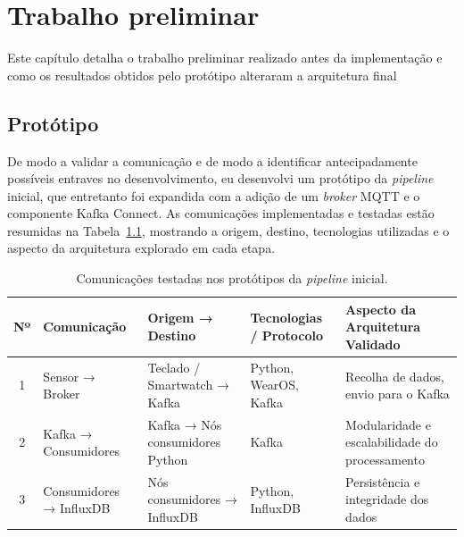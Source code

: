 \chapter{Trabalho preliminar}
\label{chap:preliminar}

\begin{introduction}
Este capítulo detalha o trabalho preliminar realizado antes da implementação e como os resultados obtidos pelo protótipo alteraram a arquitetura final
\end{introduction}


\section{Protótipo}

De modo a validar a comunicação e de modo a identificar antecipadamente possíveis entraves no desenvolvimento, eu desenvolvi um protótipo da \textit{pipeline} inicial, que entretanto foi expandida com a adição de um \textit{broker} \ac{MQTT} e o componente Kafka Connect.
As comunicações implementadas e testadas estão resumidas na Tabela~\ref{tab:comunicacoes-prototipo}, mostrando a origem, destino, tecnologias utilizadas e o aspecto da arquitetura explorado em cada etapa.

\begin{table}[H]
    \centering
    \caption{Comunicações testadas nos protótipos da \textit{pipeline} inicial.}
    \label{tab:comunicacoes-prototipo}
    \begin{tabularx}{\textwidth}{c|l|X|l|X}
        \hline
        Nº & Comunicação & Origem → Destino & Tecnologias / Protocolo & Aspecto da Arquitetura Validado \\
        \hline
        1 & Sensor → Broker & Teclado / Smartwatch → Kafka & Python, WearOS, Kafka & Recolha de dados, envio para o Kafka \\
        2 & Kafka → Consumidores~\footnotemark & Kafka → Nós consumidores Python & Kafka & Modularidade e escalabilidade do processamento \\
        3 & Consumidores → InfluxDB & Nós consumidores → InfluxDB & Python, InfluxDB & Persistência e integridade dos dados \\
        \hline
    \end{tabularx}
\end{table}


